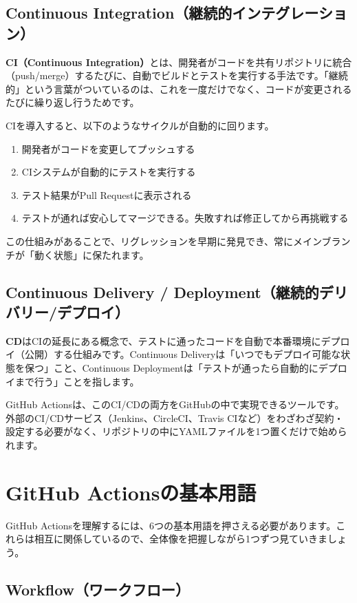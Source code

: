 \subsection{Continuous Integration（継続的インテグレーション）}

\textbf{CI（Continuous Integration）}とは、開発者がコードを共有リポジトリに統合（push/merge）するたびに、自動でビルドとテストを実行する手法です。「継続的」という言葉がついているのは、これを一度だけでなく、コードが変更されるたびに繰り返し行うためです。

CIを導入すると、以下のようなサイクルが自動的に回ります。

\begin{enumerate}
  \item 開発者がコードを変更してプッシュする
  \item CIシステムが自動的にテストを実行する
  \item テスト結果がPull Requestに表示される
  \item テストが通れば安心してマージできる。失敗すれば修正してから再挑戦する
\end{enumerate}

この仕組みがあることで、リグレッションを早期に発見でき、常にメインブランチが「動く状態」に保たれます。

\subsection{Continuous Delivery / Deployment（継続的デリバリー/デプロイ）}

\textbf{CD}はCIの延長にある概念で、テストに通ったコードを自動で本番環境にデプロイ（公開）する仕組みです。Continuous Deliveryは「いつでもデプロイ可能な状態を保つ」こと、Continuous Deploymentは「テストが通ったら自動的にデプロイまで行う」ことを指します。

GitHub Actionsは、このCI/CDの両方をGitHubの中で実現できるツールです。外部のCI/CDサービス（Jenkins、CircleCI、Travis CIなど）をわざわざ契約・設定する必要がなく、リポジトリの中にYAMLファイルを1つ置くだけで始められます。

\section{GitHub Actionsの基本用語}

GitHub Actionsを理解するには、6つの基本用語を押さえる必要があります。これらは相互に関係しているので、全体像を把握しながら1つずつ見ていきましょう。

\subsection{Workflow（ワークフロー）}


